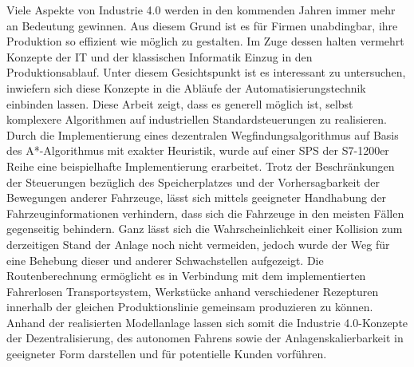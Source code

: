 	Viele Aspekte von Industrie 4.0 werden in den kommenden Jahren immer mehr an Bedeutung gewinnen. Aus diesem Grund ist es für Firmen unabdingbar, ihre Produktion so effizient wie möglich zu gestalten. Im Zuge dessen halten vermehrt Konzepte der IT und der klassischen Informatik Einzug in den Produktionsablauf. Unter diesem Gesichtspunkt ist es interessant zu untersuchen, inwiefern sich diese Konzepte in die Abläufe der Automatisierungstechnik einbinden lassen. Diese Arbeit zeigt, dass es generell möglich ist, selbst komplexere Algorithmen auf industriellen Standardsteuerungen zu realisieren. Durch die Implementierung eines dezentralen Wegfindungsalgorithmus auf Basis des A*-Algorithmus mit exakter Heuristik, wurde auf einer \ac{SPS} der S7-1200er Reihe eine beispielhafte Implementierung erarbeitet. Trotz der Beschränkungen der Steuerungen bezüglich des Speicherplatzes und der Vorhersagbarkeit der Bewegungen anderer Fahrzeuge, lässt sich mittels geeigneter Handhabung der Fahrzeuginformationen verhindern, dass sich die Fahrzeuge in den meisten Fällen gegenseitig behindern. Ganz lässt sich die Wahrscheinlichkeit einer Kollision zum derzeitigen Stand der Anlage noch nicht vermeiden, jedoch wurde der Weg für eine Behebung dieser und anderer Schwachstellen aufgezeigt. Die Routenberechnung ermöglicht es in Verbindung mit dem implementierten Fahrerlosen Transportsystem, Werkstücke anhand verschiedener Rezepturen innerhalb der gleichen Produktionslinie gemeinsam produzieren zu können. Anhand der realisierten Modellanlage lassen sich somit die Industrie 4.0-Konzepte der Dezentralisierung, des autonomen Fahrens sowie der Anlagenskalierbarkeit in geeigneter Form darstellen und für potentielle Kunden vorführen.
	
	